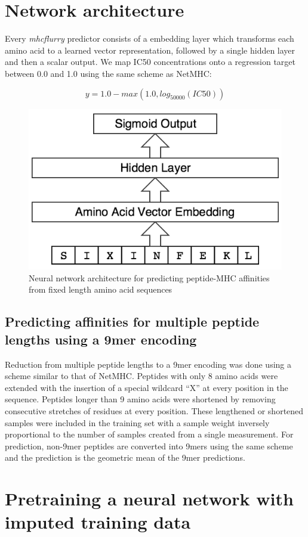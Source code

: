 
\section{Network architecture}
Every {\it mhcflurry} predictor consists of a embedding layer which transforms each amino acid to a learned vector representation, followed by a single hidden layer and then a scalar output. We map IC50 concentrations onto a regression target between 0.0 and 1.0 using the same scheme as NetMHC:

\[
    y = 1.0 - max(1.0, log_{50000}(IC50))
\]

\begin{figure}[h]
\centering
\includegraphics[scale=0.5]{figures/mhcflurry-gliffy-network.png}
\caption{Neural network architecture for predicting peptide-MHC affinities from fixed length amino acid sequences}
\end{figure}

\subsection{Predicting affinities for multiple peptide lengths using a 9mer encoding}
Reduction from multiple peptide lengths to a 9mer encoding was done using a scheme similar to that of NetMHC\cite{lundegaard2008accurate}. Peptides with only 8 amino acids were extended with the insertion of a special wildcard ``X'' at every position in the sequence. Peptides longer than 9 amino acids were shortened by removing consecutive stretches of residues at every position. These lengthened or shortened samples were included in the training set with a sample weight inversely proportional to the number of samples created from a single measurement. For prediction, non-9mer peptides are converted into 9mers using the same scheme and the prediction is the geometric mean of the 9mer predictions.


\section{Pretraining a neural network with imputed training data}


